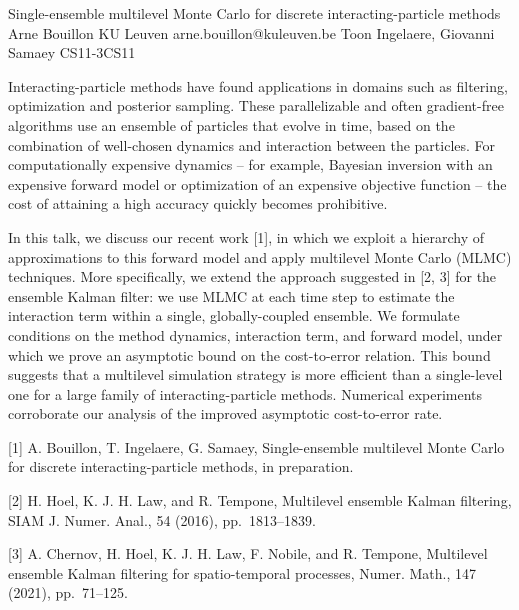 \begin{talk}
  {Single-ensemble multilevel Monte Carlo for discrete interacting-particle methods}%
  {Arne Bouillon}%
  {KU Leuven}%
  {arne.bouillon@kuleuven.be}%
  {Toon Ingelaere, Giovanni Samaey}%
{}{}{CS11-3}{CS11}


Interacting-particle methods have found applications in domains such as filtering, optimization and posterior sampling. These parallelizable and often gradient-free algorithms use an ensemble of particles that evolve in time, based on the combination of well-chosen dynamics and interaction between the particles. For computationally expensive dynamics -- for example, Bayesian inversion with an expensive forward model or optimization of an expensive objective function -- the cost of attaining a high accuracy quickly becomes prohibitive.

In this talk, we discuss our recent work [1], in which we exploit a hierarchy of approximations to this forward model and apply multilevel Monte Carlo (MLMC) techniques. More specifically, we extend the approach suggested in [2, 3] for the ensemble Kalman filter: we use MLMC at each time step to estimate the interaction term within a single, globally-coupled ensemble. We formulate conditions on the method dynamics, interaction term, and forward model, under which we prove an asymptotic bound on the cost-to-error relation. This bound suggests that a multilevel simulation strategy is more efficient than a single-level one for a large family of interacting-particle methods. Numerical experiments corroborate our analysis of the improved asymptotic cost-to-error rate.

\medskip

[1] A. Bouillon, T. Ingelaere, G. Samaey, Single-ensemble multilevel Monte Carlo for discrete interacting-particle methods, in preparation.

[2] H. Hoel, K. J. H. Law, and R. Tempone, Multilevel ensemble Kalman filtering, SIAM J. Numer. Anal., 54 (2016), pp.\ 1813--1839.

[3] A. Chernov, H. Hoel, K. J. H. Law, F. Nobile, and R. Tempone, Multilevel ensemble Kalman filtering for spatio-temporal processes, Numer. Math., 147 (2021), pp.\ 71--125.
\end{talk}

